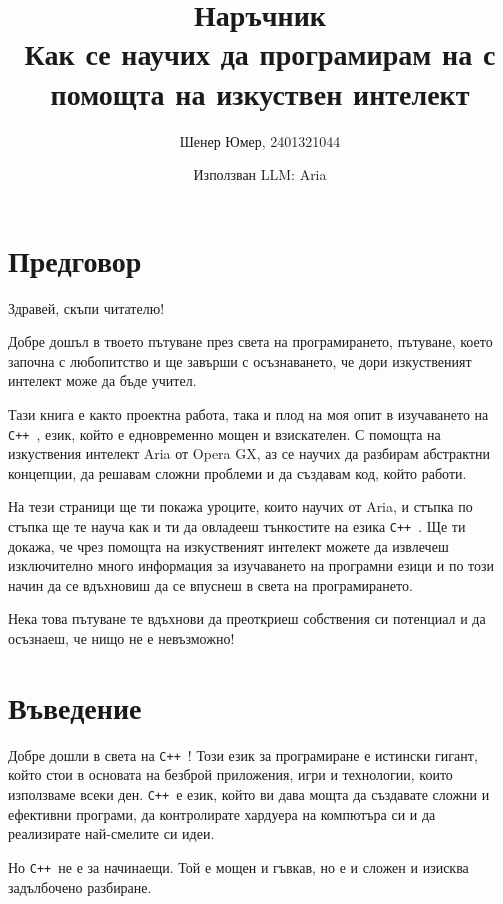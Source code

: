\documentclass[oneside]{book}
\title{Наръчник\\Как се научих да програмирам на \cpp
с помощта на изкуствен интелект}
\author{Шенер Юмер, 2401321044}
\date{Използван LLM: Aria}
\newcommand*{\cpp}{\texttt{C++}\ }
\begin{document}
\maketitle
\tableofcontents
\newpage

\chapter*{Предговор}
Здравей, скъпи читателю!

Добре дошъл в твоето пътуване през света на програмирането, пътуване,
което започна с любопитство и ще завърши с осъзнаването, че дори изкуственият
интелект може да бъде учител.

Тази книга е както проектна работа, така и плод на моя опит в изучаването на \cpp,
език, който е едновременно мощен и взискателен. С помощта на изкуствения интелект
Aria от Opera GX, аз се научих да разбирам абстрактни концепции, да решавам сложни
проблеми и да създавам код, който работи.

На тези страници ще ти покажа уроците, които научих от Aria, и стъпка по стъпка ще те
науча как и ти да овладееш тънкостите на езика \cpp. Ще ти докажа, че чрез помощта на 
изкуственият интелект можете да извлечеш изключително много информация за изучаването
на програмни езици и по този начин да се вдъхновиш да се впуснеш в света
на програмирането.

Нека това пътуване те вдъхнови да преоткриеш собствения си потенциал
и да осъзнаеш, че нищо не е невъзможно!

\chapter{Въведение}
Добре дошли в света на \cpp! Този език за програмиране е истински гигант, който стои в основата на безброй приложения, игри и технологии, които използваме всеки ден. \cpp е език, който ви дава мощта да създавате сложни и ефективни програми, да контролирате хардуера на компютъра си и да реализирате най-смелите си идеи. 

Но \cpp не е за начинаещи. Той е мощен и гъвкав, но е и сложен и изисква задълбочено разбиране.  
\end{document}
